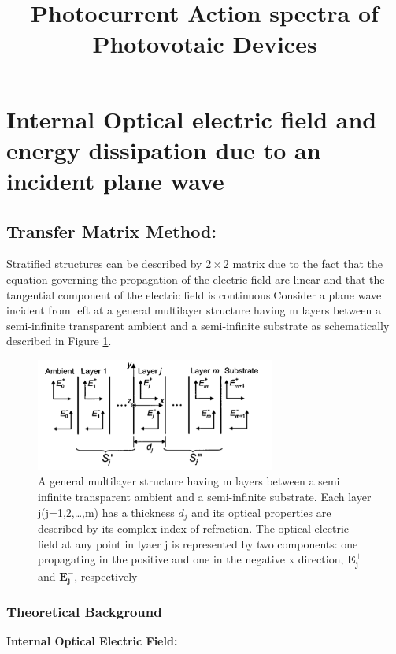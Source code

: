 \documentclass{article}
\begin{document}
\title{Photocurrent Action spectra of Photovotaic Devices}
\maketitle
\section{Internal Optical electric field and energy dissipation due to an incident plane wave
}
\subsection{Transfer Matrix Method:~\cite{pettersson1999modeling}}

Stratified structures can be described by $2\times2$ matrix 
due to the fact that the equation governing the propagation 
of the electric field are linear and that the tangential component 
of the electric field is continuous.Consider a plane wave incident from left at a general multilayer 
structure having m layers between a semi-infinite transparent ambient 
and a semi-infinite substrate as schematically described in Figure
\ref{fig:layers}.
\begin{figure}[h!]
  \centering
    \includegraphics[width=0.7\textwidth]{layers}
  \caption{A general multilayer structure having m layers between a semi 
  infinite transparent ambient and a semi-infinite substrate. 
 Each layer j(j=1,2,…,m) has a thickness $d_{j}$ and its optical properties are
 described by its complex index of refraction. The optical electric field at any
 point in lyaer j is represented by two components: one propagating in the
 positive and one in the negative x direction, $\mathbf{E_{j}^{+}}$ and
 $\mathbf{E_{j}^{-}}$, respectively} \label{fig:layers} 
\end{figure}
\subsubsection{Theoretical Background}
\textbf{Internal Optical Electric Field:}
\end{document}
